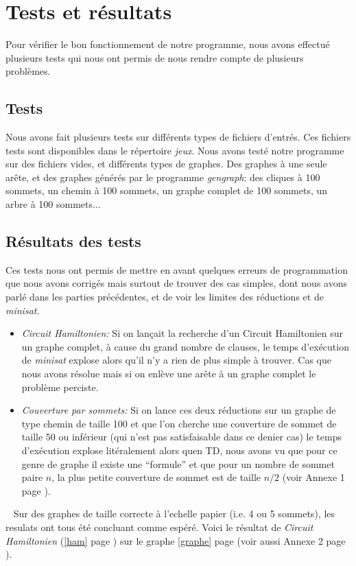  \section{Tests et résultats}
  Pour vérifier le bon fonctionnement de notre programme, nous avons
  effectué plusieurs tests qui nous ont permis de nous rendre compte de
  plusieurs problèmes.

  \subsection{Tests}
  Nous avons fait plusieurs tests sur différents types de fichiers
  d'entrés. Ces fichiers tests sont disponibles dans le répertoire
  \emph{jeux}. \newline
  \indent Nous avons testé notre programme sur des fichiers vides,
  et différents types de graphes. Des graphes à une seule arête, et des
  graphes générés par le programme \emph{gengraph}: des cliques à 100
  sommets, un chemin à 100 sommets, un graphe complet de 100 sommets, un
  arbre à 100 sommets...

  \subsection{Résultats des tests}
  Ces tests nous ont permis de mettre en avant quelques erreurs de
  programmation que nous avons corrigés mais surtout de trouver des cas
  simples, dont nous avons parlé dans les parties précédentes, et de
  voir les limites des réductions et de \emph{minisat}.\newline
  \begin{itemize}
   \item \emph{Circuit Hamiltonien:} Si on lançait la recherche d'un
	 Circuit Hamiltonien sur un graphe complet, à cause du grand
	 nombre de clauses, le temps d'exécution de \emph{minisat}
	 explose alors qu'il n'y a rien de plus simple à trouver. Cas
	 que nous avons résolue mais si on enlève une arête à un graphe
	 complet le problème perciste.\\
   \item \emph{Couverture par sommets:} Si on lance ces deux
	 réductions sur un graphe de type chemin de taille 100 et que
	 l'on cherche une couverture de sommet de taille 50 ou
	 inférieur (qui n'est pas satisfaisable dans ce denier cas) le
	 temps d'exécution explose litéralement alors quen TD, nous
	 avons vu que pour ce genre de graphe il existe une ``formule''
	 et que pour un nombre de sommet paire $n$, la plus petite
	 couverture de sommet est de taille $n/2$ (voir Annexe 1 page \pageref{an1}).
  \end{itemize}
  ~\newline
  \indent Sur des graphes de taille correcte à l'echelle papier (i.e. 4 ou 5
  sommets), les resulats ont tous été concluant comme espéré. Voici le
  résultat de \emph{Circuit Hamiltonien} (\ref{ham} page \pageref{ham}) sur le
  graphe \ref{graphe} page \pageref{graphe} (voir aussi Annexe 2 page
  \pageref{an2}).

